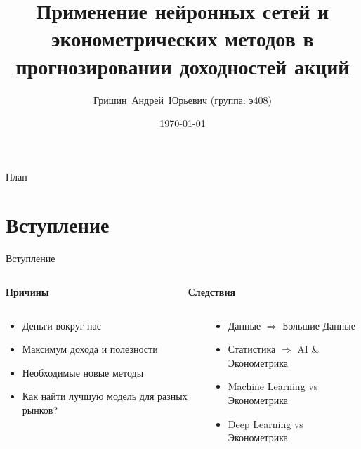 \documentclass[11pt, aspectratio= 169]{beamer}
\title[Прогнозирование доходностей акций]{Применение нейронных сетей и эконометрических методов в прогнозировании доходностей акций}
\author[Гришин А.Ю.]{Гришин~Андрей~Юрьевич ({\small группа: э408})}
\institute[ЭФ МГУ]{Экономический Факультет Московского Государтвенного Университета}
\date{\today}
\begin{document}
	\begin{frame}
		\maketitle
	\end{frame}
	
	\begin{frame}{План}
		\tableofcontents
	\end{frame}
	
	\section{Вступление}
	\begin{frame}{Вступление}
		\begin{columns}
			\begin{column}{0.5\textwidth}
				\centering
				\begin{LARGE}
					\textbf{Причины}
				\end{LARGE}
			\end{column}
			\begin{column}{0.5\textwidth}
				\centering
				\begin{LARGE}
					\textbf{Следствия}
				\end{LARGE}
			\end{column}
		\end{columns}
		\vspace{0.3cm}
		\begin{columns}
			\begin{column}{0.5\textwidth}
				\large
				\begin{itemize}
					\item Деньги вокруг нас
					\item Максимум дохода и полезности
					\item Необходимые новые методы
					\item Как найти лучшую модель для разных рынков?
				\end{itemize}
			\end{column}
			\hspace{0.5cm}
			\begin{column}{0.5\textwidth}
				\large
				\begin{itemize}
					\item Данные $\Rightarrow$ Большие Данные
					\item Статистика $\Rightarrow$ AI \& Эконометрика
					\item Machine Learning vs Эконометрика
					\item Deep Learning vs Эконометрика
				\end{itemize}
			\end{column}
		\end{columns}
	\end{frame}
	
\end{document}

